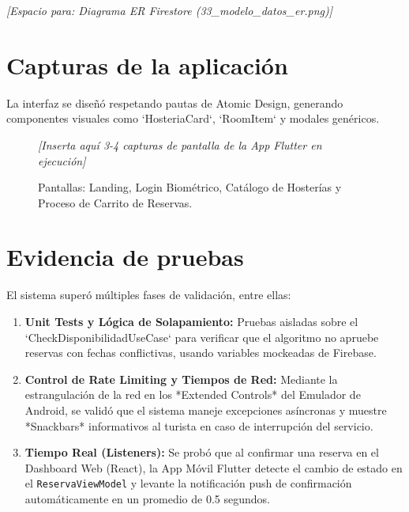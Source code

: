 \documentclass{article}
\begin{document}
\vspace{0.5cm}
\begin{center}
    \textit{[Espacio para: Diagrama ER Firestore (33\_modelo\_datos\_er.png)]}
\end{center}

\section{Capturas de la aplicación}
La interfaz se diseñó respetando pautas de Atomic Design, generando componentes visuales como `HosteriaCard`, `RoomItem` y modales genéricos.

\begin{figure}[H]
    \centering
    \textit{[Inserta aquí 3-4 capturas de pantalla de la App Flutter en ejecución]}
    \caption{Pantallas: Landing, Login Biométrico, Catálogo de Hosterías y Proceso de Carrito de Reservas.}
\end{figure}

\section{Evidencia de pruebas}
El sistema superó múltiples fases de validación, entre ellas:
\begin{enumerate}
    \item \textbf{Unit Tests y Lógica de Solapamiento:} Pruebas aisladas sobre el `CheckDisponibilidadUseCase` para verificar que el algoritmo no apruebe reservas con fechas conflictivas, usando variables mockeadas de Firebase.
    \item \textbf{Control de Rate Limiting y Tiempos de Red:} Mediante la estrangulación de la red en los *Extended Controls* del Emulador de Android, se validó que el sistema maneje excepciones asíncronas y muestre *Snackbars* informativos al turista en caso de interrupción del servicio.
    \item \textbf{Tiempo Real (Listeners):} Se probó que al confirmar una reserva en el Dashboard Web (React), la App Móvil Flutter detecte el cambio de estado en el \texttt{ReservaViewModel} y levante la notificación push de confirmación automáticamente en un promedio de 0.5 segundos.
\end{enumerate}
\end{document}
